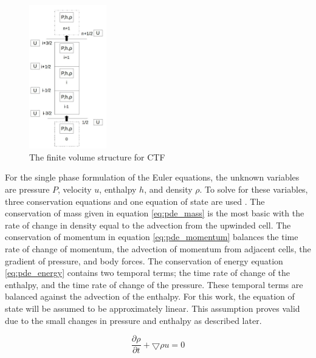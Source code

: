\documentclass{mc2015}
\begin{document}
\begin{figure}[!h]
	\centering
	\includegraphics[width=0.30\textwidth]{images/CTF-Cells}
	\caption{The finite volume structure for CTF}
	\label{fig:CTF-Cells}
\end{figure}

For the single phase formulation of the Euler equations, the unknown variables
are pressure $P$, velocity $u$, enthalpy $h$, and density $\rho$. To solve for
these variables, three conservation equations and one equation of state are
used \cite{Cooper2007}. The conservation of mass given in equation
\ref{eq:pde_mass} is the most basic with the rate of change in density equal to
the advection from the upwinded cell. The conservation of momentum in equation \ref{eq:pde_momentum}
balances the time rate of change of momentum, the advection of momentum from
adjacent cells, the gradient of pressure, and body forces. The conservation of
energy equation \ref{eq:pde_energy} contains two temporal terms; the time
rate of change of the enthalpy, and the time rate of change of the pressure.
These temporal terms are balanced against the advection of the enthalpy. 
For this work, the equation of state will be assumed to be approximately linear.
This assumption proves valid due to the small changes in pressure and
enthalpy as described later.
    
    \begin{equation}
    	\label{eq:pde_mass}
    	\frac{ \partial \rho}{\partial t} + \bigtriangledown \rho u = 0
    \end{equation}
    
\end{document}
